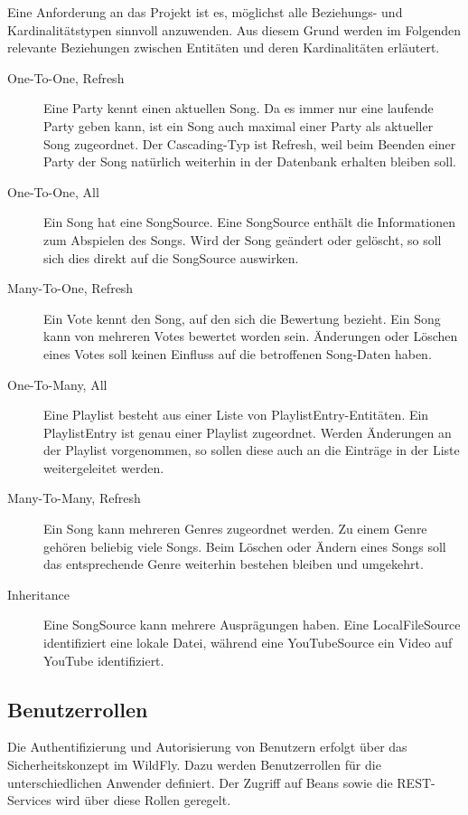 Eine Anforderung an das Projekt ist es, möglichst alle Beziehungs- und Kardinalitätstypen sinnvoll anzuwenden. Aus diesem Grund werden im Folgenden relevante Beziehungen zwischen Entitäten und deren Kardinalitäten erläutert.

\begin{description}
	\item[One-To-One, Refresh] Eine Party kennt einen aktuellen Song. Da es immer nur eine laufende Party geben kann, ist ein Song auch maximal einer Party als aktueller Song zugeordnet. Der Cascading-Typ ist Refresh, weil beim Beenden einer Party der Song natürlich weiterhin in der Datenbank erhalten bleiben soll.
	\item[One-To-One, All] Ein Song hat eine SongSource. Eine SongSource enthält die Informationen zum Abspielen des Songs. Wird der Song geändert oder gelöscht, so soll sich dies direkt auf die SongSource auswirken.
	\item[Many-To-One, Refresh] Ein Vote kennt den Song, auf den sich die Bewertung bezieht. Ein Song kann von mehreren Votes bewertet worden sein. Änderungen oder Löschen eines Votes soll keinen Einfluss auf die betroffenen Song-Daten haben.
	\item[One-To-Many, All] Eine Playlist besteht aus einer Liste von PlaylistEntry-Entitäten. Ein PlaylistEntry ist genau einer Playlist zugeordnet. Werden Änderungen an der Playlist vorgenommen, so sollen diese auch an die Einträge
	in der Liste weitergeleitet werden.
	\item[Many-To-Many, Refresh] Ein Song kann mehreren Genres zugeordnet werden. Zu einem Genre gehören beliebig viele Songs. Beim Löschen oder Ändern eines Songs soll das entsprechende Genre weiterhin bestehen bleiben und umgekehrt.
	\item[Inheritance] Eine SongSource kann mehrere Ausprägungen haben. Eine LocalFileSource identifiziert eine lokale Datei, während eine YouTubeSource ein Video auf YouTube identifiziert.
\end{description}



\subsection{Benutzerrollen}
\label{sec:Benutzerrollen}
Die Authentifizierung und Autorisierung von Benutzern erfolgt über das Sicherheitskonzept im WildFly. Dazu werden Benutzerrollen für die unterschiedlichen Anwender definiert. Der Zugriff auf Beans sowie die REST-Services wird über diese Rollen geregelt. 


